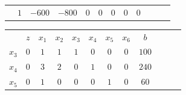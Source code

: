 \begin{frame}
{\begin{table}
\begin{tabular}{c c c c c c c c c c c c}
				& \cellcolor{yellow!60}  $ \scriptstyle 1$
				& \cellcolor{yellow!60}  $ \scriptstyle -600$ 
				& \cellcolor{yellow!60}  $ \scriptstyle -800$
				& \cellcolor{yellow!60}  $ \scriptstyle 0$
				& \cellcolor{yellow!60}  $ \scriptstyle 0$
				& \cellcolor{yellow!60}  $ \scriptstyle 0$
				& \cellcolor{yellow!60}  $ \scriptstyle 0$ 
				& \cellcolor{yellow!60}  $ \scriptstyle 0$ \\
			\end{tabular}
		\end{table}	
	}	
	{
		\begin{table}
			\begin{tabular}{c c c c c c c c c c c c}
				& \cellcolor{blue!80} \color{white} $ \scriptstyle z$
				& \cellcolor{blue!80} \color{white} $ \scriptstyle x_1$ 
				& \cellcolor{blue!80} \color{white} $ \scriptstyle x_2$
				& \cellcolor{blue!80} \color{red} $ \scriptstyle x_3$
				& \cellcolor{blue!80} \color{red} $ \scriptstyle x_4$
				& \cellcolor{blue!80} \color{red} $ \scriptstyle x_5$
				& \cellcolor{blue!80} \color{red} $ \scriptstyle x_6$ 
				& \cellcolor{blue!80} \color{white} $ \scriptstyle b$ \\
				\cellcolor{blue!80} \color{red} $ \scriptstyle x_3$
				& \cellcolor{yellow!60}  $ \scriptstyle 0$
				& \cellcolor{yellow!60}  $ \scriptstyle 1$ 
				& \cellcolor{gray!60}  $ \scriptstyle 1$
				& \cellcolor{yellow!60}  $ \scriptstyle 1$
				& \cellcolor{yellow!60}  $ \scriptstyle 0$
				& \cellcolor{yellow!60}  $ \scriptstyle 0$
				& \cellcolor{yellow!60}  $ \scriptstyle 0$ 
				& \cellcolor{yellow!60}  $ \scriptstyle 100$ \\ 
				\cellcolor{blue!80} \color{red} $ \scriptstyle x_4$
				& \cellcolor{yellow!60}  $ \scriptstyle 0$
				& \cellcolor{yellow!60}  $ \scriptstyle 3$ 
				& \cellcolor{gray!60}  $ \scriptstyle 2$
				& \cellcolor{yellow!60}  $ \scriptstyle 0$
				& \cellcolor{yellow!60}  $ \scriptstyle 1$
				& \cellcolor{yellow!60}  $ \scriptstyle 0$
				& \cellcolor{yellow!60}  $ \scriptstyle 0$ 
				& \cellcolor{yellow!60}  $ \scriptstyle 240$ \\ 
				\cellcolor{blue!80} \color{red} $ \scriptstyle x_5$  
				& \cellcolor{yellow!60}  $ \scriptstyle 0$
				& \cellcolor{yellow!60}  $ \scriptstyle 1$ 
				& \cellcolor{gray!60}  $ \scriptstyle 0$
				& \cellcolor{yellow!60}  $ \scriptstyle 0$
				& \cellcolor{yellow!60}  $ \scriptstyle 0$
				& \cellcolor{yellow!60}  $ \scriptstyle 1$
				& \cellcolor{yellow!60}  $ \scriptstyle 0$ 
				& \cellcolor{yellow!60}  $ \scriptstyle 60$ \\

\end{tabular}
\end{table}}
\end{frame}
